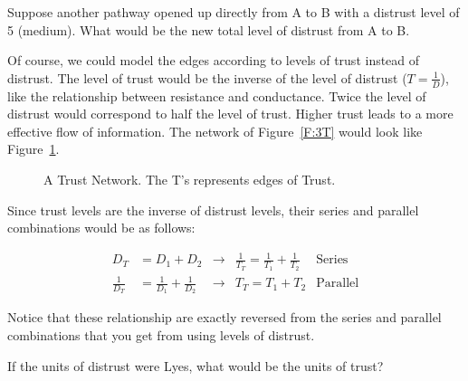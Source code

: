 \begin{clevel}
Suppose another pathway opened up directly from A to B with a distrust level of 5 (medium). What would be the new total level of distrust from A to B.
\end{clevel}

Of course, we could model the edges according to levels of trust instead of distrust. The level of trust would be the inverse of the level of distrust ($T=\frac{1}{D}$), like the relationship between resistance and conductance. Twice the level of distrust would correspond to half the level of trust. Higher trust leads to a more effective flow of information. The network of Figure~\ref{F:3T} would look like Figure~\ref{F:3T2}.
 
\begin{figure}[H]
\begin{center}
\caption{A Trust Network. The T's represents edges of Trust.}
\label{F:3T2}
\end{center}
\end{figure}

Since trust levels are the inverse of distrust levels, their series and parallel combinations would be as follows:

\begin{align*}
D_T&=D_1+D_2&\rightarrow&\frac{1}{T_T}=\frac{1}{T_1}+\frac{1}{T_2}&\text{Series}\\
\frac{1}{D_T}&=\frac{1}{D_1}+\frac{1}{D_2}&\rightarrow&T_T=T_1+T_2&\text{Parallel}
\end{align*}

Notice that these relationship are exactly reversed from the series and parallel combinations that you get from using levels of distrust.\par

\begin{blevel}
If the units of distrust were Lyes, what would be the units of trust?
\end{blevel}

